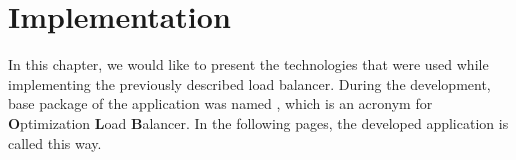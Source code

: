 \chapter{Implementation}\label{ch:implementation}
In this chapter, we would like to present the technologies that were used while implementing the previously described load balancer.
During the development,
base package of the application was named ,
which is an acronym for \textbf{O}ptimization \textbf{L}oad \textbf{B}alancer.
In the following pages, 
the developed application is called this way.







